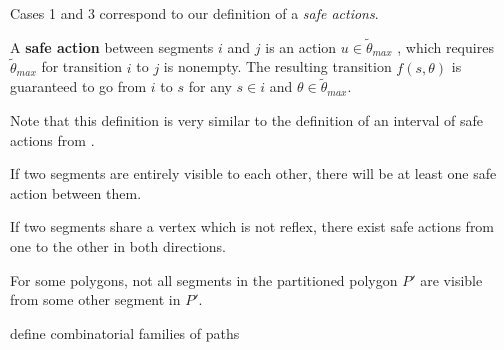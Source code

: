 \documentclass[]{styles/svproc}  %
\begin{document}
Cases 1 and 3 correspond to our definition of a \emph{safe actions}.

\begin{definition} \label{def:sa}
A \textbf{safe action} between segments $i$ and $j$ is an action $u \in \tilde{\theta}_{max}$
, which requires $\tilde{\theta}_{max}$ for transition $i$ to $j$ is nonempty.
The resulting transition $f(s, \theta)$ is guaranteed to
go from $i$ to $s$ for any $s \in i$ and $\theta \in \tilde{\theta}_{max}$.
\end{definition}

Note that this definition is very similar to the definition of an interval of
safe actions from \cite{LewOKa13}.

\begin{lemma}
If two segments are entirely visible to each other, there will be at least one safe
action between them.
\end{lemma}

\begin{lemma}
If two segments share a vertex which is not reflex, there exist safe actions
from one to the other in both directions.
\end{lemma}

\begin{lemma}
For some polygons, not all segments in the partitioned polygon $P'$ are visible
from some other segment in $P'$.
\end{lemma}

{\color{red} define combinatorial families of paths}


%
%
\end{document}
